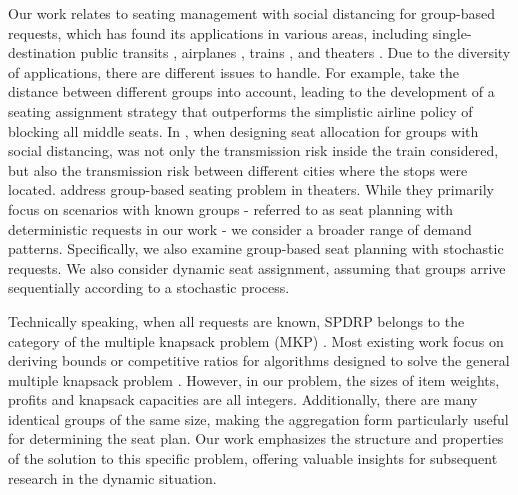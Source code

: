 Our work relates to seating management with social distancing for group-based requests, which has found its applications in various areas, including single-destination public transits \citep{moore2021seat}, airplanes \citep{ghorbani2020model, salari2022social}, trains \citep{haque2022optimization, haque2023social}, and theaters \citep{blom2022filling}. Due to the diversity of applications, there are different issues to handle. For example, \citet{salari2022social} take the distance between different groups into account, leading to the development of a seating assignment strategy that outperforms the simplistic airline policy of blocking all middle seats. In \citet{haque2023social}, when designing seat allocation for groups with social distancing, was not only the transmission risk inside the train considered, but also the transmission risk between different cities where the stops were located. \citet{blom2022filling} address group-based seating problem in theaters. While they primarily focus on scenarios with known groups - referred to as seat planning with deterministic requests in our work - we consider a broader range of demand patterns. Specifically, we also examine group-based seat planning with stochastic requests. We also consider dynamic seat assignment, assuming that groups arrive sequentially according to a stochastic process.


Technically speaking, when all requests are known, SPDRP belongs to the category of the multiple knapsack problem (MKP) \citep{martello1990knapsack}. Most existing work focus on deriving bounds or competitive ratios for algorithms designed to solve the general multiple knapsack problem \citep{khuri1994zero, ferreira1996solving, pisinger1999exact, chekuri2005polynomial}. However, in our problem, the sizes of item weights, profits and knapsack capacities are all integers. Additionally, there are many identical groups of the same size, making the aggregation form particularly useful for determining the seat plan. Our work emphasizes the structure and properties of the solution to this specific problem, offering valuable insights for subsequent research in the dynamic situation.




